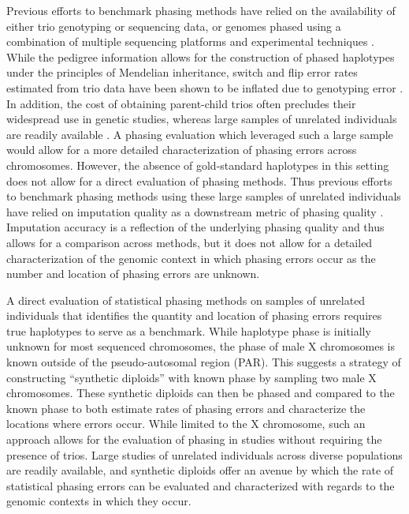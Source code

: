 Previous efforts to benchmark phasing methods have relied on the availability of either trio genotyping or sequencing data, or genomes phased using a combination of multiple sequencing platforms and experimental techniques \citep{Choi2018}. While the pedigree information allows for the construction of phased haplotypes under the principles of Mendelian inheritance, switch and flip error rates estimated from trio data have been shown to be inflated due to genotyping error \citep{Browning2022}. In addition, the cost of obtaining parent-child trios often precludes their widespread use in genetic studies, whereas large samples of unrelated individuals are readily available \citep{ByrskaBishop2022}. A phasing evaluation which leveraged such a large sample would allow for a more detailed characterization of phasing errors across chromosomes. However, the absence of gold-standard haplotypes in this setting does not allow for a direct evaluation of phasing methods. Thus previous efforts to benchmark phasing methods using these large samples of unrelated individuals have relied on imputation quality as a downstream metric of phasing quality \citep{Stahl2021, DeMarino2022}. Imputation accuracy is a reflection of the underlying phasing quality and thus allows for a comparison across methods, but it does not allow for a detailed characterization of the genomic context in which phasing errors occur as the number and location of phasing errors are unknown. 

A direct evaluation of statistical phasing methods on samples of unrelated individuals that identifies the quantity and location of phasing errors requires true haplotypes to serve as a benchmark. While haplotype phase is initially unknown for most sequenced chromosomes, the phase of male X chromosomes is known outside of the pseudo-autosomal region (PAR). This suggests a strategy of constructing “synthetic diploids” with known phase by sampling two male X chromosomes. These synthetic diploids can then be phased and compared to the known phase to both estimate rates of phasing errors and characterize the locations where errors occur. While limited to the X chromosome, such an approach allows for the evaluation of phasing in studies without requiring the presence of trios. Large studies of unrelated individuals across diverse populations are readily available, and synthetic diploids offer an avenue by which the rate of statistical phasing errors can be evaluated and characterized with regards to the genomic contexts in which they occur.

